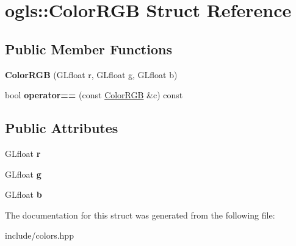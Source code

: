 \hypertarget{structogls_1_1ColorRGB}{\section{ogls\-:\-:Color\-R\-G\-B Struct Reference}
\label{structogls_1_1ColorRGB}
}
\subsection*{Public Member Functions}
\begin{DoxyCompactItemize}
\item 
\hypertarget{structogls_1_1ColorRGB_adda6e4c3d16a5223e4448926cae42e6e}{{\bfseries Color\-R\-G\-B} (G\-Lfloat r, G\-Lfloat g, G\-Lfloat b)}\label{structogls_1_1ColorRGB_adda6e4c3d16a5223e4448926cae42e6e}

\item 
\hypertarget{structogls_1_1ColorRGB_adf308e06c0ffb612ab463729006c08b2}{bool {\bfseries operator==} (const \hyperlink{structogls_1_1ColorRGB}{Color\-R\-G\-B} \&c) const }\label{structogls_1_1ColorRGB_adf308e06c0ffb612ab463729006c08b2}

\end{DoxyCompactItemize}
\subsection*{Public Attributes}
\begin{DoxyCompactItemize}
\item 
\hypertarget{structogls_1_1ColorRGB_abb7530c0981b6cc9cd77bf21bdb595e0}{G\-Lfloat {\bfseries r}}\label{structogls_1_1ColorRGB_abb7530c0981b6cc9cd77bf21bdb595e0}

\item 
\hypertarget{structogls_1_1ColorRGB_a72cbd03e8ec12a3da22261f873c4ec75}{G\-Lfloat {\bfseries g}}\label{structogls_1_1ColorRGB_a72cbd03e8ec12a3da22261f873c4ec75}

\item 
\hypertarget{structogls_1_1ColorRGB_a2925e36d7044e74da5e50a349dc63906}{G\-Lfloat {\bfseries b}}\label{structogls_1_1ColorRGB_a2925e36d7044e74da5e50a349dc63906}

\end{DoxyCompactItemize}


The documentation for this struct was generated from the following file\-:\begin{DoxyCompactItemize}
\item 
include/colors.\-hpp\end{DoxyCompactItemize}
